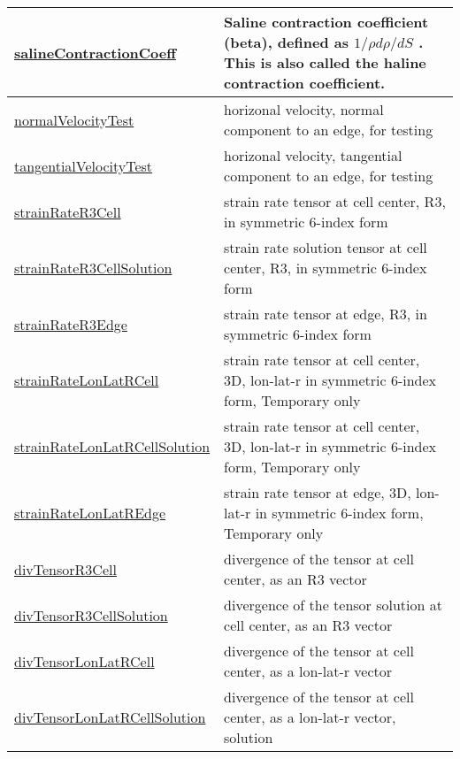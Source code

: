 {\begin{center}
\begin{longtable}{| p{2.0in} | p{4.0in} |}
	\hline
	\hyperref[subsec:var_sec_scratch_salineContractionCoeff]{salineContractionCoeff} &  Saline contraction coefficient (beta), defined as  $1/\rho d\rho/dS$ . This is also called the haline contraction coefficient. \\
	\hline
	\hyperref[subsec:var_sec_scratch_normalVelocityTest]{normalVelocityTest} & horizonal velocity, normal component to an edge, for testing \\
	\hline
	\hyperref[subsec:var_sec_scratch_tangentialVelocityTest]{tangentialVelocityTest} & horizonal velocity, tangential component to an edge, for testing \\
	\hline
	\hyperref[subsec:var_sec_scratch_strainRateR3Cell]{strainRateR3Cell} & strain rate tensor at cell center, R3, in symmetric 6-index form \\
	\hline
	\hyperref[subsec:var_sec_scratch_strainRateR3CellSolution]{strainRateR3CellSolution} & strain rate solution tensor at cell center, R3, in symmetric 6-index form \\
	\hline
	\hyperref[subsec:var_sec_scratch_strainRateR3Edge]{strainRateR3Edge} & strain rate tensor at edge, R3, in symmetric 6-index form \\
	\hline
	\hyperref[subsec:var_sec_scratch_strainRateLonLatRCell]{strainRateLonLatRCell} & strain rate tensor at cell center, 3D, lon-lat-r in symmetric 6-index form, {\color{red}Temporary only} \\
	\hline
	\hyperref[subsec:var_sec_scratch_strainRateLonLatRCellSolution]{strainRateLonLatRCellSolution} & strain rate tensor at cell center, 3D, lon-lat-r in symmetric 6-index form, {\color{red}Temporary only} \\
	\hline
	\hyperref[subsec:var_sec_scratch_strainRateLonLatREdge]{strainRateLonLatREdge} & strain rate tensor at edge, 3D, lon-lat-r in symmetric 6-index form, {\color{red}Temporary only} \\
	\hline
	\hyperref[subsec:var_sec_scratch_divTensorR3Cell]{divTensorR3Cell} & divergence of the tensor at cell center, as an R3 vector \\
	\hline
	\hyperref[subsec:var_sec_scratch_divTensorR3CellSolution]{divTensorR3CellSolution} & divergence of the tensor solution at cell center, as an R3 vector \\
	\hline
	\hyperref[subsec:var_sec_scratch_divTensorLonLatRCell]{divTensorLonLatRCell} & divergence of the tensor at cell center, as a lon-lat-r vector \\
	\hline
	\hyperref[subsec:var_sec_scratch_divTensorLonLatRCellSolution]{divTensorLonLatRCellSolution} & divergence of the tensor at cell center, as a lon-lat-r vector, solution \\

\end{longtable}
\end{center}}
